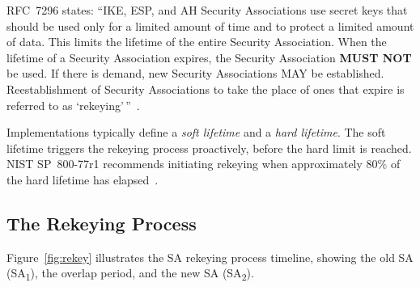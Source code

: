 \documentclass[sigconf,nonacm]{acmart}
\begin{document}
RFC~7296 states: ``IKE, ESP, and AH Security Associations use secret keys that should
be used only for a limited amount of time and to protect a limited amount of data.
This limits the lifetime of the entire Security Association. When the lifetime of a
Security Association expires, the Security Association \textbf{MUST NOT} be used. If
there is demand, new Security Associations MAY be established. Reestablishment of
Security Associations to take the place of ones that expire is referred to as
`rekeying'\,''~\cite{rfc7296}.

Implementations typically define a \emph{soft lifetime} and a \emph{hard lifetime}.
The soft lifetime triggers the rekeying process proactively, before the hard limit
is reached. NIST SP~800-77r1 recommends initiating rekeying when approximately 80\%
of the hard lifetime has elapsed~\cite{nist80077}.

\subsection{The Rekeying Process}

Figure~\ref{fig:rekey} illustrates the SA rekeying process timeline, showing the
old SA (SA\textsubscript{1}), the overlap period, and the new SA (SA\textsubscript{2}).
\end{document}

